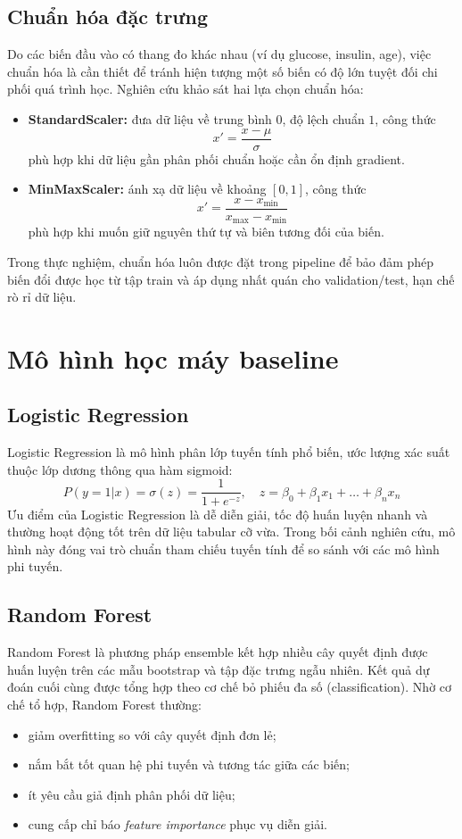 \subsection{Chuẩn hóa đặc trưng}
Do các biến đầu vào có thang đo khác nhau (ví dụ glucose, insulin, age), việc chuẩn hóa là cần thiết để tránh hiện tượng
một số biến có độ lớn tuyệt đối chi phối quá trình học. Nghiên cứu khảo sát hai lựa chọn chuẩn hóa:
\begin{itemize}[leftmargin=1.5em]
    \item \textbf{StandardScaler:} đưa dữ liệu về trung bình \(0\), độ lệch chuẩn \(1\), công thức
    \[
        x' = \frac{x - \mu}{\sigma}
    \]
    phù hợp khi dữ liệu gần phân phối chuẩn hoặc cần ổn định gradient.
    \item \textbf{MinMaxScaler:} ánh xạ dữ liệu về khoảng \([0,1]\), công thức
    \[
        x' = \frac{x - x_{\min}}{x_{\max} - x_{\min}}
    \]
    phù hợp khi muốn giữ nguyên thứ tự và biên tương đối của biến.
\end{itemize}

Trong thực nghiệm, chuẩn hóa luôn được đặt trong pipeline để bảo đảm phép biến đổi được học từ tập train và áp dụng nhất quán
cho validation/test, hạn chế rò rỉ dữ liệu.

\section{Mô hình học máy baseline}
\subsection{Logistic Regression}
Logistic Regression là mô hình phân lớp tuyến tính phổ biến, ước lượng xác suất thuộc lớp dương thông qua hàm sigmoid:
\[
    P(y=1|x) = \sigma(z) = \frac{1}{1 + e^{-z}}, \quad z = \beta_0 + \beta_1x_1 + \dots + \beta_nx_n
\]
Ưu điểm của Logistic Regression là dễ diễn giải, tốc độ huấn luyện nhanh và thường hoạt động tốt trên dữ liệu tabular cỡ vừa.
Trong bối cảnh nghiên cứu, mô hình này đóng vai trò chuẩn tham chiếu tuyến tính để so sánh với các mô hình phi tuyến.

\subsection{Random Forest}
Random Forest là phương pháp ensemble kết hợp nhiều cây quyết định được huấn luyện trên các mẫu bootstrap và tập đặc trưng ngẫu nhiên.
Kết quả dự đoán cuối cùng được tổng hợp theo cơ chế bỏ phiếu đa số (classification). Nhờ cơ chế tổ hợp, Random Forest thường:
\begin{itemize}[leftmargin=1.5em]
    \item giảm overfitting so với cây quyết định đơn lẻ;
    \item nắm bắt tốt quan hệ phi tuyến và tương tác giữa các biến;
    \item ít yêu cầu giả định phân phối dữ liệu;
    \item cung cấp chỉ báo \textit{feature importance} phục vụ diễn giải.
\end{itemize}


